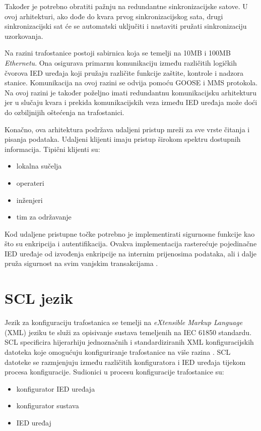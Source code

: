 \documentclass[times, utf8, zavrsni]{fer}
\begin{document}
Također je potrebno obratiti pažnju na redundantne sinkronizacijske satove. U ovoj arhitekturi, ako dođe do kvara prvog sinkronizacijskog sata, drugi sinkronizacijski sat će se automatski uključiti i nastaviti pružati sinkronizaciju uzorkovanja.

Na razini trafostanice postoji sabirnica  koja se temelji na 10MB i 100MB \textit{Ethernetu}. Ona osigurava primarnu komunikaciju između različitih logičkih čvorova IED uređaja koji pružaju različite funkcije zaštite, kontrole i nadzora stanice. Komunikacija na ovoj razini se odvija pomoću GOOSE i MMS protokola. Na ovoj razini je također poželjno imati redundantnu komunikacijsku arhitekturu jer u slučaju kvara i prekida komunikacijskih veza između IED uređaja može doći do ozbiljnijih oštećenja na trafostanici.

Konačno, ova arhitektura podržava udaljeni pristup mreži za sve vrste čitanja i pisanja podataka. Udaljeni klijenti imaju pristup širokom spektru dostupnih informacija. Tipični klijenti su:
\begin{itemize}
    \item lokalna sučelja 
    \item operateri
    \item inženjeri
    \item tim za održavanje
\end{itemize}

Kod udaljene pristupne točke potrebno je implementirati sigurnosne funkcije kao što su enkripcija i autentifikacija. Ovakva implementacija rasterećuje pojedinačne IED uređaje od izvođenja enkripcije na internim prijenosima podataka, ali i dalje pruža sigurnost na svim vanjskim transakcijama \citep{baigent2004iec}.

\chapter{SCL jezik}
Jezik za konfiguraciju trafostanica  se temelji na \textit{eXtensible Markup Language} (XML) jeziku te služi za opisivanje sustava temeljenih na IEC 61850 standardu. SCL specificira hijerarhiju jednoznačnih i standardiziranih XML konfiguracijskih datoteka koje omogućuju konfiguriranje trafostanice na više razina \citep{baigent2004iec}. SCL datoteke se razmjenjuju između različitih konfiguratora i IED uređaja tijekom procesa konfiguracije. Sudionici u procesu konfiguracije trafostanice su:
\begin{itemize}
    \item konfigurator IED uređaja
    \item konfigurator sustava
    \item IED uređaj
\end{itemize}
\end{document}
